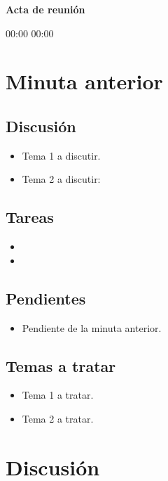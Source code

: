 \documentclass[spanish]{article}
\begin{document}
\begin{center}
    \Huge{\textbf{Acta de reunión}}
\end{center}

\vspace{0.3cm}

\hour
{00:00}
{00:00}


\section*{Minuta anterior}

\subsection*{Discusión}
\begin{itemize}
    \item{Tema 1 a discutir.}
    \item{Tema 2 a discutir:}
\end{itemize}

\subsection*{Tareas}
\begin{itemize}
    \item{}
    \item{}
\end{itemize}

\subsection*{Pendientes}
\begin{itemize}
    \item{Pendiente de la minuta anterior.}
\end{itemize}

\subsection*{Temas a tratar}
\begin{itemize}
    \item{Tema 1 a tratar.}
    \item{Tema 2 a tratar.}
\end{itemize}


\newpage
\section*{Discusión}
\end{document}

